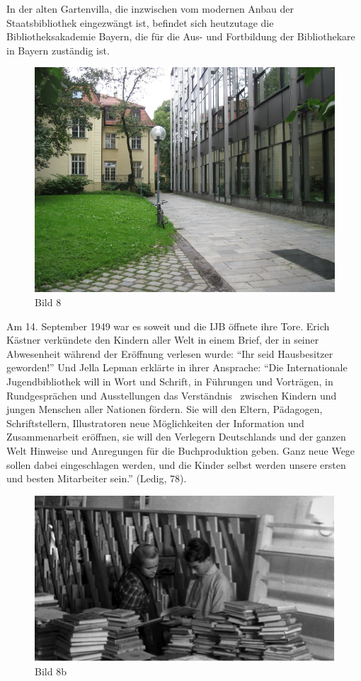 \documentclass[a4paper,
fontsize=11pt,
oneside,
numbers=noperiodatend,
parskip=half-,
bibliography=totoc,
final
]{scrartcl}
\begin{document}
In der alten Gartenvilla, die inzwischen vom modernen Anbau der
Staatsbibliothek eingezwängt ist, befindet sich heutzutage die
Bibliotheksakademie Bayern, die für die Aus- und Fortbildung der
Bibliothekare in Bayern zuständig ist.

\begin{figure}[htbp]
\centering
\includegraphics{img/Bild8.jpg}
\caption{Bild 8}
\end{figure}

Am 14. September 1949 war es soweit und die IJB öffnete ihre Tore. Erich
Kästner verkündete den Kindern aller Welt in einem Brief, der in seiner
Abwesenheit während der Eröffnung verlesen wurde: \enquote{Ihr seid
Hausbesitzer geworden!} Und Jella Lepman erklärte in ihrer Ansprache:
\enquote{Die Internationale Jugendbibliothek will in Wort und Schrift,
in Führungen und Vorträgen, in Rundgesprächen und Ausstellungen das
Verständnis~ zwischen Kindern und jungen Menschen aller Nationen
fördern. Sie will den Eltern, Pädagogen, Schriftstellern, Illustratoren
neue Möglichkeiten der Information und Zusammenarbeit eröffnen, sie will
den Verlegern Deutschlands und der ganzen Welt Hinweise und Anregungen
für die Buchproduktion geben. Ganz neue Wege sollen dabei eingeschlagen
werden, und die Kinder selbst werden unsere ersten und besten
Mitarbeiter sein.} (Ledig, 78).

\begin{figure}[htbp]
\centering
\includegraphics{img/Bild8b.jpg}
\caption{Bild 8b}
\end{figure}
\end{document}

